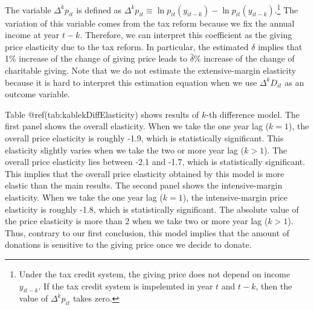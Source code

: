 \documentclass[
]{article}
\begin{document}
The variable \(\Delta^k p_{it}\) is defined as \(\Delta^k p_{it} \equiv \ln p_{it}(y_{it-k}) - \ln p_{it}(y_{it-k})\).\footnote{Under the tax credit system, the giving price does not depend on income \(y_{it-k}\). If the tax credit system is impelemted in year \(t\) and \(t-k\), then the value of \(\Delta^k p_{it}\) takes zero.}
The variation of this variable comes from the tax reform because we fix the annual income at year \(t - k\).
Therefore, we can interpret this coefficient as the giving price elasticity due to the tax reform.
In particular, the estimated \(\delta\) implies that 1\% increase of the change of giving price leads to \(\hat{\delta}\)\% increase of the change of charitable giving.
Note that we do not estimate the extensive-margin elasticity because it is hard to interpret this estimation equation when we use \(\Delta^k D_{it}\) as an outcome variable.

\color{black}

Table @ref(tab:kablekDiffElasticity) shows results of \(k\)-th difference model.
The first panel shows the overall elasticity.
When we take the one year lag (\(k = 1\)), the overall price elasticity is roughly -1.9,
which is statistically significant.
This elasticity slightly varies when we take the two or more year lag (\(k > 1\)).
The overall price elasticity lies between -2.1 and -1.7, which is statistically significant.
This implies that the overall price elasticity obtained by this model is more elastic than the main results.
The second panel shows the intensive-margin elasticity.
When we take the one year lag (\(k = 1\)), the intensive-margin price elasticity is roughly -1.8,
which is statistically significant.
The absolute value of the price elasticity is more than 2
when we take two or more year lag (\(k > 1\)).
Thus, contrary to our first conclusion,
this model implies that the amount of donations is sensitive to the giving price once we decide to donate.
\end{document}
